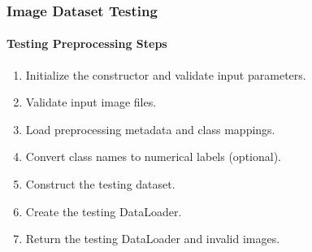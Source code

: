 \subsubsection{Image Dataset Testing}

\paragraph{Testing Preprocessing Steps}
\begin{enumerate}
    \item Initialize the constructor and validate input parameters.
    \item Validate input image files.
    \item Load preprocessing metadata and class mappings.
    \item Convert class names to numerical labels (optional).
    \item Construct the testing dataset.
    \item Create the testing DataLoader.
    \item Return the testing DataLoader and invalid images.
\end{enumerate}
\vspace{1cm}
